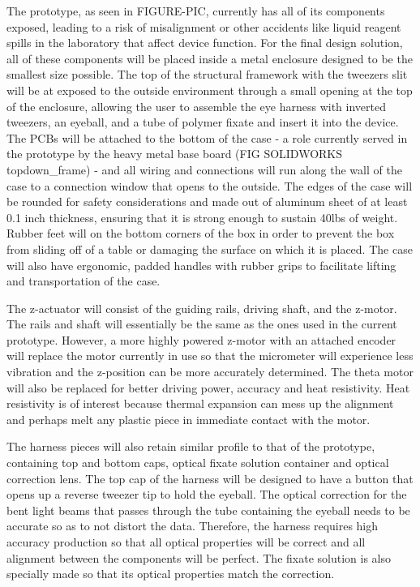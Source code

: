 \documentclass{article}
\begin{document}
The prototype, as seen in FIGURE-PIC, currently has all of its components exposed, leading to a risk of misalignment or other accidents like liquid reagent spills in the laboratory that affect device function.  For the final design solution, all of these components will be placed inside a metal enclosure designed to be the smallest size possible. The top of the structural framework with the tweezers slit will be at exposed to the outside environment through a small opening at the top of the enclosure, allowing the user to assemble the eye harness with inverted tweezers, an eyeball, and a tube of polymer fixate and insert it into the device. The PCBs will be attached to the bottom of the case - a role currently served in the prototype by the heavy metal base board (FIG SOLIDWORKS topdown_frame) -  and all wiring and connections will run along the wall of the case to a connection window that opens to the outside. The edges of the case will be rounded for safety considerations and made out of aluminum sheet of at least 0.1 inch thickness, ensuring that it is strong enough to sustain 40lbs of weight. Rubber feet will on the bottom corners of the box in order to prevent the box from sliding off of a table or damaging the surface on which it is placed. The case will also have ergonomic, padded handles with rubber grips to facilitate lifting and transportation of the case.  

The z-actuator will consist of the guiding rails, driving shaft, and the z-motor. The rails and shaft will essentially be the same as the ones used in the current prototype. However, a more highly powered z-motor with an attached encoder will replace the motor currently in use so that the micrometer will experience less vibration and the z-position can be more accurately determined. The theta motor will also be replaced for better driving power, accuracy and heat resistivity. Heat resistivity is of interest because thermal expansion can mess up the alignment and perhaps melt any plastic piece in immediate contact with the motor.


The harness pieces will also retain similar profile to that of the prototype, containing top and bottom caps, optical fixate solution container and optical correction lens. The top cap of the harness will be designed to have a button that opens up a reverse tweezer tip to hold the eyeball. The optical correction for the bent light beams that passes through the tube containing the eyeball needs to be accurate so as to not distort the data. Therefore, the harness requires high accuracy production so that all optical properties will be correct and all alignment between the components will be perfect. The fixate solution is also specially made so that its optical properties match the correction.
\end{document}
